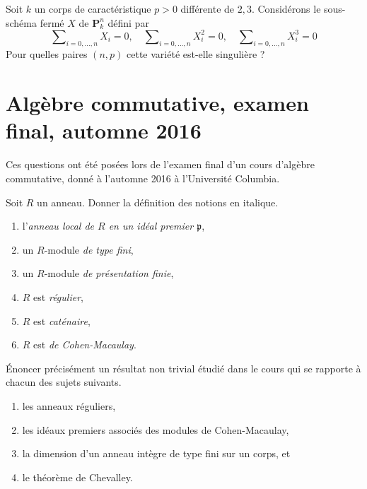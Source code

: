 \begin{exercise}
\label{exercise-vandermonde}
Soit $k$ un corps de caractéristique $p > 0$ différente de $2,3$.
Considérons le sous-schéma fermé $X$ de $\mathbf{P}^n_k$ défini par
$$
\sum\nolimits_{i = 0, \ldots, n} X_i = 0,\quad
\sum\nolimits_{i = 0, \ldots, n} X_i^2 = 0,\quad
\sum\nolimits_{i = 0, \ldots, n} X_i^3 = 0
$$
Pour quelles paires $(n, p)$ cette variété est-elle singulière ?
\end{exercise}






\section{Algèbre commutative, examen final, automne 2016}
\label{section-final-exam-fall-2016}

\noindent
Ces questions ont été posées lors de l'examen final d'un cours
d'algèbre commutative, donné à l'automne 2016 à l'Université Columbia.

\begin{exercise}[Définitions]
\label{exercise-definitions-fall-2016}
Soit $R$ un anneau.
Donner la définition des notions en italique.
\begin{enumerate}
\item l'{\it anneau local de $R$ en un idéal premier $\mathfrak p$},
\item un $R$-module {\it de type fini},
\item un $R$-module {\it de présentation finie},
\item $R$ est {\it régulier},
\item $R$ est {\it caténaire},
\item $R$ est {\it de Cohen-Macaulay}.
\end{enumerate}
\end{exercise}

\begin{exercise}[Théorèmes]
\label{exercise-results-fall-2016}
Énoncer précisément un résultat non trivial étudié dans le cours qui se rapporte
à chacun des sujets suivants.
\begin{enumerate}
\item les anneaux réguliers,
\item les idéaux premiers associés des modules de Cohen-Macaulay,
\item la dimension d'un anneau intègre de type fini sur un corps, et
\item le théorème de Chevalley.
\end{enumerate}
\end{exercise}

